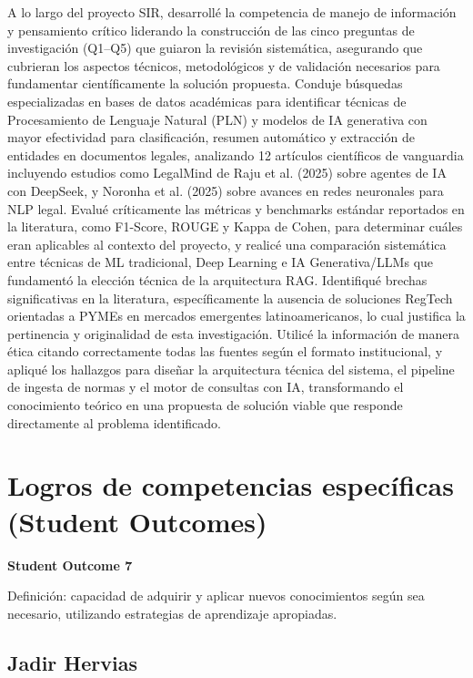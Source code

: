 \documentclass[12pt,a4paper,oneside]{report}
\begin{document}
A lo largo del proyecto SIR, desarrollé la competencia de manejo de información y pensamiento crítico liderando la construcción de las cinco preguntas de investigación (Q1--Q5) que guiaron la revisión sistemática, asegurando que cubrieran los aspectos técnicos, metodológicos y de validación necesarios para fundamentar científicamente la solución propuesta. Conduje búsquedas especializadas en bases de datos académicas para identificar técnicas de Procesamiento de Lenguaje Natural (PLN) y modelos de IA generativa con mayor efectividad para clasificación, resumen automático y extracción de entidades en documentos legales, analizando 12 artículos científicos de vanguardia incluyendo estudios como LegalMind de Raju et al. (2025) sobre agentes de IA con DeepSeek, y Noronha et al. (2025) sobre avances en redes neuronales para NLP legal. Evalué críticamente las métricas y benchmarks estándar reportados en la literatura, como F1-Score, ROUGE y Kappa de Cohen, para determinar cuáles eran aplicables al contexto del proyecto, y realicé una comparación sistemática entre técnicas de ML tradicional, Deep Learning e IA Generativa/LLMs que fundamentó la elección técnica de la arquitectura RAG. Identifiqué brechas significativas en la literatura, específicamente la ausencia de soluciones RegTech orientadas a PYMEs en mercados emergentes latinoamericanos, lo cual justifica la pertinencia y originalidad de esta investigación. Utilicé la información de manera ética citando correctamente todas las fuentes según el formato institucional, y apliqué los hallazgos para diseñar la arquitectura técnica del sistema, el pipeline de ingesta de normas y el motor de consultas con IA, transformando el conocimiento teórico en una propuesta de solución viable que responde directamente al problema identificado.

\section{Logros de competencias específicas (Student Outcomes)}\label{sec:logros-de-competencias-especificas-student-outcomes}

\textbf{Student Outcome 7}

Definición: capacidad de adquirir y aplicar nuevos conocimientos según sea necesario, utilizando estrategias de aprendizaje apropiadas.

\subsection{Jadir Hervias}\label{subsec:jadir-hervias-2}
\end{document}
